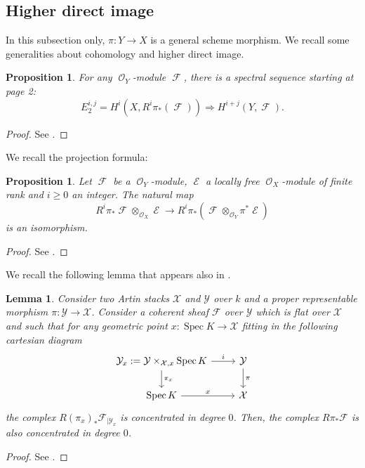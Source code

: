 \documentclass[11pt]{amsart}
\numberwithin{subsection}{section}
\numberwithin{figure}{section}
\numberwithin{table}{section}
\theoremstyle{1}
\newtheorem{lemma}[theorem]{Lemma}
\newtheorem{proposition}[theorem]{Proposition}
\theoremstyle{2}
\DeclareMathOperator{\Spec}{Spec}
\DeclareMathOperator{\Fc}{\mathcal{F}}
\DeclareMathOperator{\E}{\mathcal{E}}
\DeclareMathOperator{\Oc}{\mathcal{O}}
\begin{document}
\subsection{Higher direct image}
In this subsection only, $\pi : Y \rightarrow X$ is a general scheme morphism. We recall some generalities about cohomology and higher direct image.
\begin{proposition}
For any $\Oc_Y$-module $\Fc$, there is a spectral sequence starting at page 2:
\begin{equation*}
E_2^{i,j} = H^i(X,R^i\pi_*(\Fc)) \Rightarrow H^{i+j}(Y,\Fc).
\end{equation*}
\end{proposition}
\begin{proof}
See \cite[Lemma 01F2]{stacks-project}.
\end{proof}
We recall the projection formula:
\begin{proposition}
Let $\Fc$ be a $\Oc_Y$-module, $\E$ a locally free $\Oc_X$-module of finite rank and $i \geq 0$ an integer. The natural map
\begin{equation*}
R^i\pi_*\Fc \otimes_{\Oc_X} \E \rightarrow R^i\pi_*(\Fc \otimes_{\Oc_Y} \pi^*\E)
\end{equation*}
is an isomorphism.
\end{proposition}
\begin{proof}
See \cite[Lemma 01E8]{stacks-project}.
\end{proof}
We recall the following lemma that appears also in \cite{alexandre2022vanishing}.
\begin{lemma}\label{lem1}
Consider two Artin stacks $\mathcal{X}$ and $\mathcal{Y}$ over $k$ and a proper representable morphism $\pi : \mathcal{Y} \rightarrow \mathcal{X}$. Consider a coherent sheaf $\mathcal{F}$ over $\mathcal{Y}$ which is flat over $\mathcal{X}$ and such that for any geometric point $x : \Spec K \rightarrow \mathcal{X}$ fitting in the following cartesian diagram
\begin{equation*}
\begin{tikzcd}
\mathcal{Y}_x := \mathcal{Y}\times_{\mathcal{X},x}\Spec K \arrow[d,"\pi_x"] \arrow[r,"i"] & \mathcal{Y} \arrow[d,"\pi"] \\
\Spec K \arrow[r,"x"] & \mathcal{X}
\end{tikzcd}
\end{equation*}
the complex $R{(\pi_x)}_*\mathcal{F}_{|\mathcal{Y}_x}$ is concentrated in degree $0$. Then, the complex $R\pi_*\mathcal{F}$ is also concentrated in degree $0$.
\end{lemma}
\begin{proof}
See \cite[Lemma 3.19]{alexandre2022vanishing}.
\end{proof}
\end{document}
